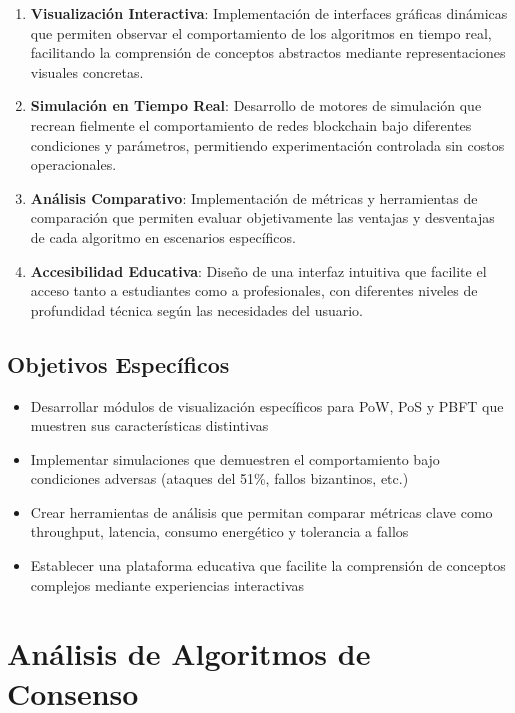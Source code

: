 \begin{enumerate}
    \item \textbf{Visualización Interactiva}: Implementación de interfaces gráficas dinámicas que permiten observar el comportamiento de los algoritmos en tiempo real, facilitando la comprensión de conceptos abstractos mediante representaciones visuales concretas.
    
    \item \textbf{Simulación en Tiempo Real}: Desarrollo de motores de simulación que recrean fielmente el comportamiento de redes blockchain bajo diferentes condiciones y parámetros, permitiendo experimentación controlada sin costos operacionales.
    
    \item \textbf{Análisis Comparativo}: Implementación de métricas y herramientas de comparación que permiten evaluar objetivamente las ventajas y desventajas de cada algoritmo en escenarios específicos.
    
    \item \textbf{Accesibilidad Educativa}: Diseño de una interfaz intuitiva que facilite el acceso tanto a estudiantes como a profesionales, con diferentes niveles de profundidad técnica según las necesidades del usuario.
\end{enumerate}

\subsection{Objetivos Específicos}

\begin{itemize}
    \item Desarrollar módulos de visualización específicos para PoW, PoS y PBFT que muestren sus características distintivas
    \item Implementar simulaciones que demuestren el comportamiento bajo condiciones adversas (ataques del 51\%, fallos bizantinos, etc.)
    \item Crear herramientas de análisis que permitan comparar métricas clave como throughput, latencia, consumo energético y tolerancia a fallos
    \item Establecer una plataforma educativa que facilite la comprensión de conceptos complejos mediante experiencias interactivas
\end{itemize}

\section{Análisis de Algoritmos de Consenso}

